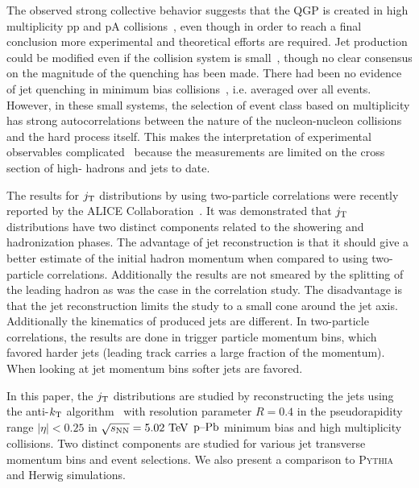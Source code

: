 The observed strong collective behavior suggests that the QGP is created in high multiplicity pp and pA collisions~\cite{Abelev:2012ola,Aad:2012gla,Chatrchyan:2013nka,Khachatryan:2010gv,Khachatryan:2016txc,Aidala:2016vgl}, even though in order to reach a final conclusion more experimental and theoretical efforts are required. Jet production could be modified even if the collision system is small~\cite{Zhang:2013oca,Park:2016jap,TYWONIUK201485}, though no clear consensus on the magnitude of the quenching has been made. There had been no evidence of jet quenching in minimum bias collisions~\cite{Khachatryan:2016odn,ALICEjt}, i.e. averaged over all events.  However, in these small systems, the selection of event class based on multiplicity has strong autocorrelations between the nature of the nucleon-nucleon collisions and the hard process itself. This makes the interpretation of experimental observables complicated~\cite{Adam:2014qja, Adam:2016jfp,Nagle:2018nvi} because the measurements are limited on the cross section of high-\pt{} hadrons and jets to date.

The results for $j_{\rm T}$ distributions by using two-particle correlations were recently reported by the ALICE Collaboration~\cite{ALICEjt}.
It was demonstrated that $j_{\rm T}$ distributions have two distinct components related to the showering and hadronization phases.
The advantage of jet reconstruction is that it should give a better estimate of the initial hadron momentum when compared to using two-particle correlations. Additionally the results are not smeared by the splitting of the leading hadron as was the case in the correlation study. The disadvantage is that the jet reconstruction limits the study to a small cone around the jet axis. Additionally the kinematics of produced jets are different. In two-particle correlations, the results are done in trigger particle momentum bins, which favored harder jets (leading track carries a large fraction of the momentum). When looking at jet momentum bins softer jets are favored.

In this paper, the $j_{\rm T}$ distributions are studied by reconstructing the jets using the anti-$k_{\rm T}$ algorithm~\cite{antikt} with resolution parameter $R=0.4$ in the pseudorapidity range $|\eta|<0.25$ in $\sqrt{s_{\mathrm{NN}}} = 5.02~\mathrm{TeV}$ $\mbox{p--Pb}$ minimum bias and high multiplicity collisions.
Two distinct components are studied for various jet transverse momentum bins and event selections.
We also present a comparison to \textsc{Pythia} and Herwig simulations.

